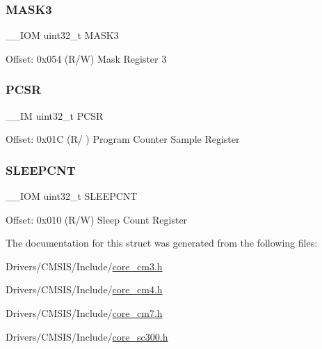 \subsubsection{\texorpdfstring{M\+A\+S\+K3}{MASK3}}
{\footnotesize\ttfamily \+\_\+\+\_\+\+I\+OM uint32\+\_\+t M\+A\+S\+K3}

Offset\+: 0x054 (R/W) Mask Register 3 \mbox{\label{struct_d_w_t___type_a72e52fffe9ac6af0ee15877e2d5dac41}} 
\subsubsection{\texorpdfstring{P\+C\+SR}{PCSR}}
{\footnotesize\ttfamily \+\_\+\+\_\+\+IM uint32\+\_\+t P\+C\+SR}

Offset\+: 0x01C (R/ ) Program Counter Sample Register \mbox{\label{struct_d_w_t___type_aafa1400cd3168b21652b86599ad3ed83}} 
\subsubsection{\texorpdfstring{S\+L\+E\+E\+P\+C\+NT}{SLEEPCNT}}
{\footnotesize\ttfamily \+\_\+\+\_\+\+I\+OM uint32\+\_\+t S\+L\+E\+E\+P\+C\+NT}

Offset\+: 0x010 (R/W) Sleep Count Register 

The documentation for this struct was generated from the following files\+:\begin{DoxyCompactItemize}
\item 
Drivers/\+C\+M\+S\+I\+S/\+Include/\mbox{\hyperlink{core__cm3_8h}{core\+\_\+cm3.\+h}}\item 
Drivers/\+C\+M\+S\+I\+S/\+Include/\mbox{\hyperlink{core__cm4_8h}{core\+\_\+cm4.\+h}}\item 
Drivers/\+C\+M\+S\+I\+S/\+Include/\mbox{\hyperlink{core__cm7_8h}{core\+\_\+cm7.\+h}}\item 
Drivers/\+C\+M\+S\+I\+S/\+Include/\mbox{\hyperlink{core__sc300_8h}{core\+\_\+sc300.\+h}}\end{DoxyCompactItemize}
